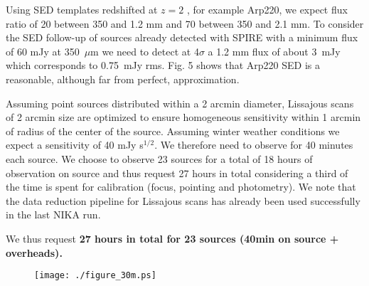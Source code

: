 \documentclass[11pt,a4]{article}
\begin{document}
Using SED templates redshifted at $z=2$ , for example Arp220, we expect
flux ratio of 20 between 350 and 1.2 mm and 70 between 350 and 2.1
mm. To consider the SED follow-up of sources already detected with
SPIRE with a minimum flux of 60 mJy at 350~$\mu$m we need to detect
at 4$\sigma$ a 1.2 mm flux of about 3~mJy which corresponds to 0.75~mJy
rms.  Fig. 5 shows that Arp220 SED is a reasonable, although far from
perfect,  approximation.

\noindent Assuming point sources distributed within a 2 arcmin diameter,
Lissajous scans of 2 arcmin size are optimized to ensure homogeneous
sensitivity within 1 arcmin of radius of the center of the source.
Assuming winter weather conditions we expect a sensitivity of 40 mJy
s$^{1/2}$.  We therefore need to observe for 40 minutes each source.
We choose to observe 23 sources for a total of 18 hours of observation
on source and thus request 27 hours in total considering a third of
the time is spent for calibration (focus, pointing and photometry).
We note that the data reduction pipeline for Lissajous scans has
already been used successfully in the last NIKA run.

We thus request {\bf 27 hours in total for 23 sources (40min on source
  + overheads).}




\begin{figure}
\texttt{[image: ./figure\_30m.ps]}
\end{figure}
\end{document}
